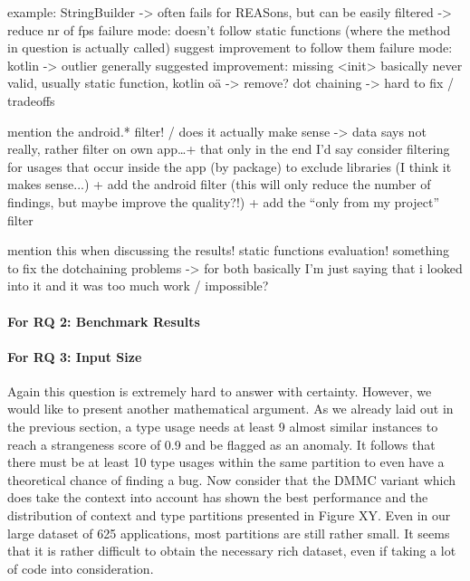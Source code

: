 example: StringBuilder -> often fails for REASons, but can be easily filtered -> reduce nr of fps
failure mode: doesn't follow static functions (where the method in question is actually called)
    suggest improvement to follow them
failure mode: kotlin -> outlier generally
suggested improvement: missing <init> basically never valid, usually static function, kotlin oä -> remove?
dot chaining -> hard to fix / tradeoffs

mention the android.* filter! / does it actually make sense -> data says not really, rather filter on own app\ldots + that only in the end I'd say
consider filtering for usages that occur inside the app (by package) to exclude libraries (I think it makes sense...)
+ add the android filter (this will only reduce the number of findings, but maybe improve the quality?!)
+ add the ``only from my project'' filter

mention this when discussing the results!
    static functions evaluation!
    something to fix the dotchaining problems
    -> for both basically I'm just saying that i looked into it and it was too much work / impossible?

\paragraph{For RQ 2: Benchmark Results}


\paragraph{For RQ 3: Input Size}

Again this question is extremely hard to answer with certainty.
However, we would like to present another mathematical argument. 
As we already laid out in the previous section, a type usage needs at least 9 almost similar instances to reach a strangeness score of 0.9 and be flagged as an anomaly.
It follows that there must be at least 10 type usages within the same partition to even have a theoretical chance of finding a bug.
Now consider that the $\text{DMMC}$ variant which does take the context into account has shown the best performance and the distribution of context and type partitions presented in Figure XY.
Even in our large dataset of 625 applications, most partitions are still rather small. 
It seems that it is rather difficult to obtain the necessary rich dataset, even if taking a lot of code into consideration.

